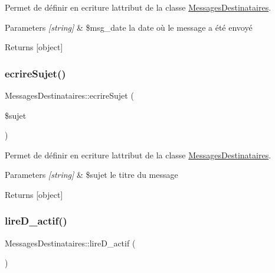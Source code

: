 Permet de définir en ecriture l\textquotesingle{}attribut de la classe \hyperlink{class_messages_destinataires}{Messages\+Destinataires}. 


\begin{DoxyParams}{Parameters}
{\em \mbox{[}string\mbox{]}} & \$msg\+\_\+date la date où le message a été envoyé \\
\hline
\end{DoxyParams}
\begin{DoxyReturn}{Returns}
\mbox{[}object\mbox{]} 
\end{DoxyReturn}
\mbox{\label{class_messages_destinataires_afc9baab378711b5c2f2ee1a55b65b2bb}} 
\subsubsection{\texorpdfstring{ecrire\+Sujet()}{ecrireSujet()}}
{\footnotesize\ttfamily Messages\+Destinataires\+::ecrire\+Sujet (\begin{DoxyParamCaption}\item[{}]{\$sujet }\end{DoxyParamCaption})}



Permet de définir en ecriture l\textquotesingle{}attribut de la classe \hyperlink{class_messages_destinataires}{Messages\+Destinataires}. 


\begin{DoxyParams}{Parameters}
{\em \mbox{[}string\mbox{]}} & \$sujet le titre du message \\
\hline
\end{DoxyParams}
\begin{DoxyReturn}{Returns}
\mbox{[}object\mbox{]} 
\end{DoxyReturn}
\mbox{\label{class_messages_destinataires_a2c74a36fd087103db15895627429f525}} 
\subsubsection{\texorpdfstring{lire\+D\+\_\+actif()}{lireD\_actif()}}
{\footnotesize\ttfamily Messages\+Destinataires\+::lire\+D\+\_\+actif (\begin{DoxyParamCaption}{ }\end{DoxyParamCaption})}



